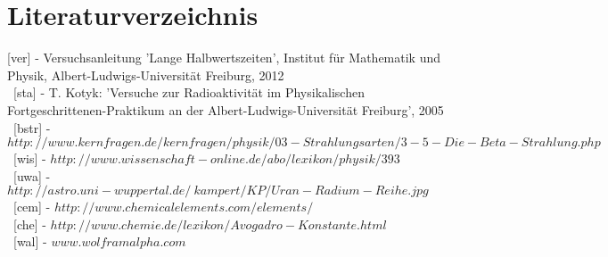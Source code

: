\clearpage
\section{Literaturverzeichnis}
[ver] - Versuchsanleitung 'Lange Halbwertszeiten', Institut für Mathematik und Physik, Albert-Ludwigs-Universität Freiburg, 2012\\
~[sta] - T. Kotyk: 'Versuche zur Radioaktivität im Physikalischen Fortgeschrittenen-Praktikum an der Albert-Ludwigs-Universität Freiburg', 2005\\ 
~[bstr] - $http://www.kernfragen.de/kernfragen/physik/03-Strahlungsarten/3-5-Die-Beta-Strahlung.php$\\
~[wis] - $http://www.wissenschaft-online.de/abo/lexikon/physik/393$\\
~[uwa] - $http://astro.uni-wuppertal.de/~kampert/KP/Uran-Radium-Reihe.jpg$\\
~[cem] - $http://www.chemicalelements.com/elements/$\\
~[che] -  $http://www.chemie.de/lexikon/Avogadro-Konstante.html$\\
~[wal] - $www.wolframalpha.com$
